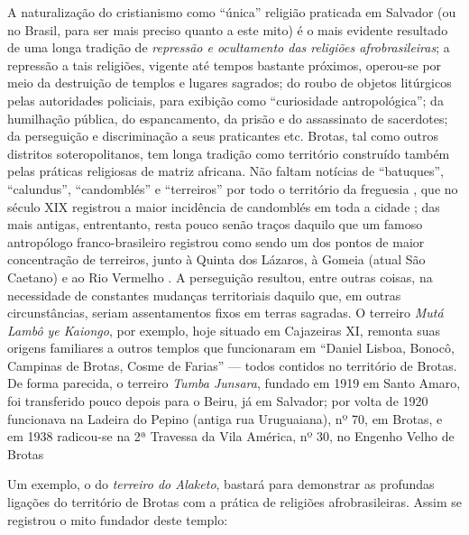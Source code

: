 A naturalização do cristianismo como ``única'' religião praticada em Salvador (ou no Brasil, para ser mais preciso quanto a este mito) é o mais evidente resultado de uma longa tradição de \textit{repressão e ocultamento das religiões afrobrasileiras}; a repressão a tais religiões, vigente até tempos bastante próximos, operou-se por meio da destruição de templos e lugares sagrados; do roubo de objetos litúrgicos pelas autoridades policiais, para exibição como ``curiosidade antropológica''; da humilhação pública, do espancamento, da prisão e do assassinato de sacerdotes; da perseguição e discriminação a seus praticantes etc. Brotas, tal como outros distritos soteropolitanos, tem longa tradição como território construído também pelas práticas religiosas de matriz africana. Não faltam notícias de ``batuques'', ``calundus'', ``candomblés'' e ``terreiros'' por todo o território da freguesia \cite{carneiro_candomble_1954,reis_domingos_2008,REISSILVA1989}, que no século XIX registrou a maior incidência de candomblés em toda a cidade \cite[p.~60]{santana_itiner_2008}; das mais antigas, entrentanto, resta pouco senão traços daquilo que um famoso antropólogo franco-brasileiro registrou como sendo um dos pontos de maior concentração de terreiros, junto à Quinta dos Lázaros, à Gomeia (atual São Caetano) e ao Rio Vermelho \cite{bastide_mystique_1978}. A perseguição resultou, entre outras coisas, na necessidade de constantes mudanças territoriais daquilo que, em outras circunstâncias, seriam assentamentos fixos em terras sagradas. O terreiro \textit{Mutá Lambô ye Kaiongo}, por exemplo, hoje situado em Cajazeiras XI, remonta suas origens familiares a outros templos que funcionaram em ``Daniel Lisboa, Bonocô, Campinas de Brotas, Cosme de Farias'' \cite[p.~50]{alves_paquetan_2010} --- todos contidos no território de Brotas. De forma parecida, o terreiro \textit{Tumba Junsara}, fundado em 1919 em Santo Amaro, foi transferido pouco depois para o Beiru, já em Salvador; por volta de 1920 funcionava na Ladeira do Pepino (antiga rua Uruguaiana), nº 70, em Brotas, e em 1938 radicou-se na 2ª Travessa da Vila América, nº 30, no Engenho Velho de Brotas \cite[p.~61]{rego_terreiros_2006}

Um exemplo, o do \textit{terreiro do Alaketo}, bastará para demonstrar as profundas ligações do território de Brotas com a prática de religiões afrobrasileiras. Assim se registrou o mito fundador deste templo:

